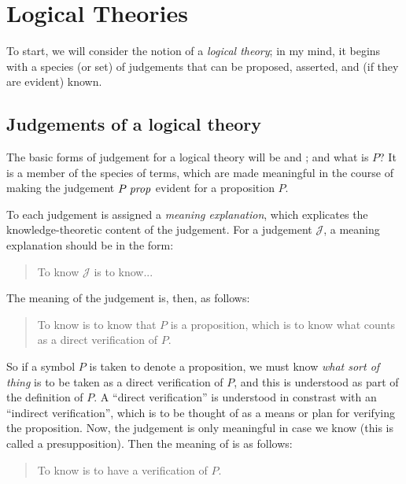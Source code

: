\documentclass[main.tex]{subfiles}
\begin{document}
\onehalfspacing

\chapter{Logical Theories}

To start, we will consider the notion of a \emph{logical theory}; in my mind,
it begins with a species (or set) of judgements that can be proposed, asserted,
and (if they are evident) known.

\section{Judgements of a logical theory}

The basic forms of judgement for a logical theory will be  and
; and what is $P$? It is a member of the species of terms,
which are made meaningful in the course of making the judgement
$P\;\mathit{prop}$ evident for a proposition $P$.

To each judgement is assigned a \emph{meaning explanation}, which explicates
the knowledge-theoretic content of the judgement. For a judgement
$\mathcal{J}$, a meaning explanation should be in the form:

\begin{quote}
  To know $\mathcal{J}$ is to know...
\end{quote}

The meaning of the judgement  is, then, as follows:

\begin{quote}
  To know  is to know that $P$ is a proposition, which is to know
  what counts as a direct verification of $P$.
\end{quote}

So if a symbol $P$ is taken to denote a proposition, we must know \emph{what
sort of thing} is to be taken as a direct verification of $P$, and this is
understood as part of the definition of $P$. A ``direct verification'' is
understood in constrast with an ``indirect verification'', which is to be
thought of as a means or plan for verifying the proposition. Now, the judgement
 is only meaningful in case we know  (this is called a
presupposition). Then the meaning of  is as follows:

\begin{quote}
  To know  is to have a verification of $P$.
\end{quote}
\end{document}
